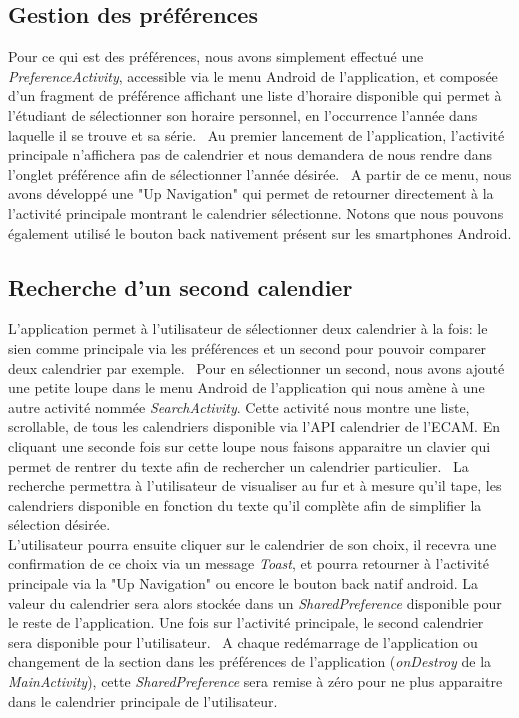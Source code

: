 \documentclass{article}
\begin{document}
	\subsection{Gestion des préférences}
    Pour ce qui est des préférences, nous avons simplement effectué une \textit{PreferenceActivity}, accessible via le menu Android de l'application,
		et composée d'un fragment de préférence affichant une liste d'horaire disponible
		qui permet à l'étudiant de sélectionner son horaire personnel, en l'occurrence l'année dans laquelle il se trouve et sa série. \
		Au premier lancement de l'application, l'activité principale n'affichera pas de calendrier et nous demandera de nous rendre dans
		l'onglet préférence afin de sélectionner l'année désirée. \
		A partir de ce menu, nous avons développé une "Up Navigation" qui permet de retourner directement à la l'activité principale montrant
		le calendrier sélectionne. Notons que nous pouvons également utilisé le bouton back
        nativement présent sur les smartphones Android.

	\subsection{Recherche d'un second calendier}
		L'application permet à l'utilisateur de sélectionner deux calendrier à la fois: le sien
        comme principale via les préférences et
		un second pour pouvoir comparer deux calendrier par exemple.  \
        Pour en sélectionner un second, nous avons ajouté une petite loupe dans le menu Android de l'application qui nous amène à une autre
        activité nommée \textit{SearchActivity}. Cette activité nous montre une liste, scrollable,
        de tous les calendriers disponible via l'API calendrier de l'ECAM.
		En cliquant une seconde fois sur cette loupe nous faisons apparaitre un clavier qui permet de rentrer du texte afin de rechercher
		un calendrier particulier. \
		La recherche permettra à l'utilisateur de visualiser au fur et à mesure qu'il tape, les calendriers disponible en fonction du
		texte qu'il complète afin de simplifier la sélection désirée. \\
		L'utilisateur pourra ensuite cliquer  sur le calendrier de son choix, il recevra une
        confirmation de ce choix via un message \textit{Toast},
		et pourra retourner à l'activité principale via la "Up Navigation" ou encore le bouton back natif android. La valeur du calendrier
        sera alors stockée dans un \textit{SharedPreference} disponible pour le reste de l'application.
		Une fois sur l'activité principale, le second calendrier sera disponible pour l'utilisateur. \
		A chaque redémarrage de l'application ou changement de la section dans les préférences de
        l'application (\textit{onDestroy} de la \textit{MainActivity}),
        cette \textit{SharedPreference} sera remise à zéro pour ne plus apparaitre dans le calendrier principale de l'utilisateur.
\end{document}
